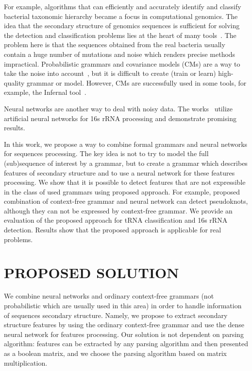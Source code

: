 \documentclass[a4paper,twoside]{article}
\begin{document}
For example, algorithms that can efficiently and accurately identify and classify bacterial taxonomic hierarchy became a focus in computational genomics.
The idea that the secondary structure of genomics sequences is sufficient for solving the detection and classification problems lies at the heart of many tools~\cite{GrammarsRNA,PCFG,meta,LWPCFG}.
The problem here is that the sequences obtained from the real bacteria usually contain a huge number of mutations and noise which renders precise methods impractical. 
Probabilistic grammars and covariance models (CMs) are a way to take the noise into account~\cite{EddyDurbin}, but it is difficult to create (train or learn) high-quality grammar or model.
However, CMs are successfully used in some tools, for example, the Infernal tool~\cite{Infernal}.

Neural networks are another way to deal with noisy data. 
The works~\cite{Humidor,ANN} utilize artificial neural networks for 16s rRNA processing and demonstrate promising results.

In this work, we propose a way to combine formal grammars and neural networks for sequences processing.
The key idea is not to try to model the full (sub)sequence of interest by a grammar, but to create a grammar which describes features of secondary structure and to use a neural network for these features processing.
We show that it is possible to detect features that are not expressible in the class of used grammars using proposed approach.
For example, proposed combination of context-free grammar and neural network can detect pseudoknots, although they can not be expressed by context-free grammar.
We provide an evaluation of the proposed approach for tRNA classification and 16s rRNA detection.
Results show that the proposed approach is applicable for real problems.

\section{\uppercase{Proposed solution}}
\label{sec:proposedSolution}

\noindent We combine neural networks and ordinary context-free grammars (not probabilistic which are usually used in this area) in order to handle information of sequences secondary structure. 
Namely, we propose to extract secondary structure features by using the ordinary context-free grammar and use the dense neural network for features processing.
Our solution is not dependent on parsing algorithm: features can be extracted by any parsing algorithm and then presented as a boolean matrix, and we choose the parsing algorithm based on matrix multiplication.
\end{document}
